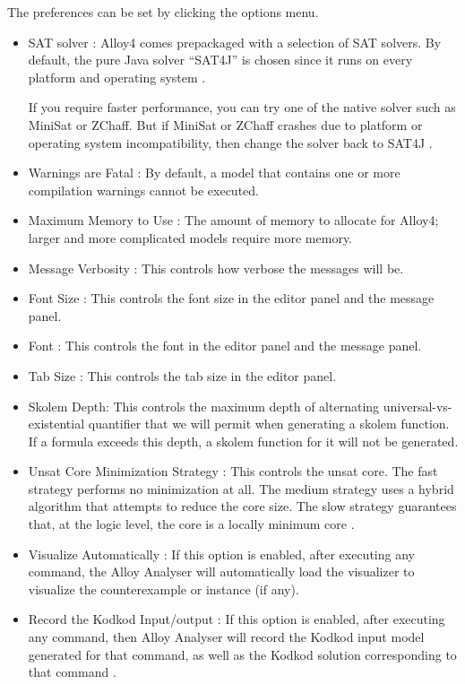 \documentclass[a4paper,12pt]{report}
\begin{document}
The preferences can be set by clicking the options menu.
\begin{itemize}
\item SAT solver : Alloy4 comes prepackaged with a selection of SAT solvers. By default, the pure Java solver ``SAT4J” is chosen since it runs on every platform and operating system \cite{DanielJackson2004}.

If you require faster performance, you can try one of the native solver such as MiniSat or ZChaff. But if MiniSat or ZChaff crashes due to platform or operating system incompatibility, then change the solver back to SAT4J \cite{DanielJackson2004}.

\item Warnings are Fatal : By default, a model that contains one or more compilation warnings cannot be executed.
\item Maximum Memory to Use : The amount of memory to allocate for Alloy4; larger and more complicated models require more memory.
\item Message Verbosity : This controls how verbose the messages will be.
\item Font Size : This controls the font size in the editor panel and the message panel.
\item Font : This controls the font in the editor panel and the message panel.
\item Tab Size : This controls the tab size in the editor panel.
\item Skolem Depth: This controls the maximum depth of alternating universal-vs-existential quantifier that we will permit when generating a skolem function. If a formula exceeds this depth, a skolem function for it will not be generated\cite{DanielJackson2004}.
\item Unsat Core Minimization Strategy : This controls the unsat core. The fast strategy performs no minimization at all. The medium strategy uses a hybrid algorithm that attempts to reduce the core size. The slow strategy guarantees that, at the logic level, the core is a locally minimum core \cite{DanielJackson2004}.
\item Visualize Automatically : If this option is enabled, after executing any command, the Alloy Analyser will automatically load the visualizer to visualize the counterexample or instance (if any)\cite{DanielJackson2004}.
\item Record the Kodkod Input/output : If this option is enabled, after executing any command, then Alloy Analyser will record the Kodkod input model generated for that command, as well as the Kodkod solution corresponding to that command \cite{DanielJackson2004}.
\end{itemize}
\end{document}
